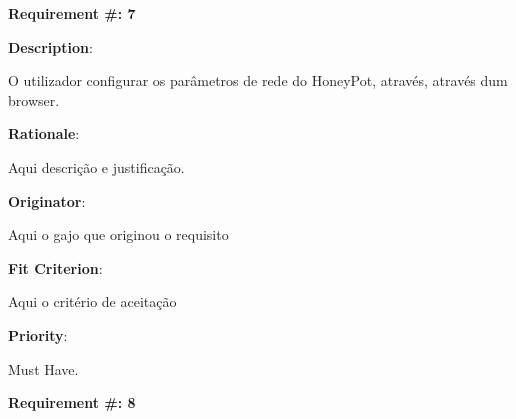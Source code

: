 \pagebreak






\begin{minipage}{0.55\textwidth}
\begin{flushleft}\textbf{Requirement \#: 7}\end{flushleft}
\end{minipage}
\begin{minipage}{0.4\textwidth}
\end{minipage}

\begin{description}
\item \textbf{Description}:

O utilizador configurar os parâmetros de rede do HoneyPot, através, através dum browser.

\item \textbf{Rationale}:

Aqui descrição e justificação. \\
\item \textbf{Originator}:

Aqui o gajo que originou o requisito\\

\item \textbf{Fit Criterion}:

Aqui o critério de aceitação \\

\item \textbf{Priority}:

Must Have. \\

\end{description}

\pagebreak






\begin{minipage}{0.55\textwidth}
\begin{flushleft}\textbf{Requirement \#: 8}\end{flushleft}
\end{minipage}
\begin{minipage}{0.4\textwidth}
\end{minipage}

